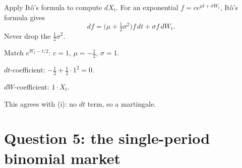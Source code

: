 \begin{problem}[Q4(b)(ii)]
Apply Itô's formula to compute $dX_t$.
\cardsays For an exponential $f=ce^{\mu t+\sigma W_t}$, Itô's formula gives
\[
df=\big(\mu+\tfrac12\sigma^2\big)f\,dt+\sigma f\,dW_t.
\]
Never drop the $\frac12\sigma^2$.
\working
\begin{steps}
\item Match $e^{W_t-t/2}$: $c=1$, $\mu=-\frac12$, $\sigma=1$.
\item $dt$-coefficient: $-\frac12+\frac12\cdot1^2=0$.
\item $dW$-coefficient: $1\cdot X_t$.
\item This agrees with (i): no $dt$ term, so a martingale.
\end{steps}
\end{problem}

\section{Question 5: the single-period binomial market}

